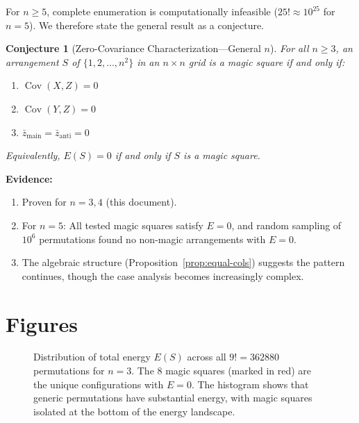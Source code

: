 \documentclass[11pt]{article}
\newtheorem{conjecture}[theorem]{Conjecture}
\theoremstyle{definition}
\theoremstyle{remark}
\begin{document}
For $n \geq 5$, complete enumeration is computationally infeasible ($25! \approx 10^{25}$ for $n=5$). We therefore state the general result as a conjecture.

\begin{conjecture}[Zero-Covariance Characterization---General $n$]\label{conj:general}
For all $n \geq 3$, an arrangement $S$ of $\{1, 2, \ldots, n^2\}$ in an $n \times n$ grid is a magic square if and only if:
\begin{enumerate}[label=(\roman*)]
\item $\operatorname{Cov}(X, Z) = 0$
\item $\operatorname{Cov}(Y, Z) = 0$
\item $\bar{z}_{\text{main}} = \bar{z}_{\text{anti}} = 0$
\end{enumerate}
Equivalently, $E(S) = 0$ if and only if $S$ is a magic square.
\end{conjecture}

\textbf{Evidence:}
\begin{enumerate}
\item Proven for $n = 3, 4$ (this document).
\item For $n = 5$: All tested magic squares satisfy $E = 0$, and random sampling of $10^6$ permutations found no non-magic arrangements with $E = 0$.
\item The algebraic structure (Proposition~\ref{prop:equal-cols}) suggests the pattern continues, though the case analysis becomes increasingly complex.
\end{enumerate}

\section{Figures}

\begin{figure}[h]
\centering
\caption{Distribution of total energy $E(S)$ across all $9! = 362880$ permutations for $n=3$. The 8 magic squares (marked in red) are the unique configurations with $E = 0$. The histogram shows that generic permutations have substantial energy, with magic squares isolated at the bottom of the energy landscape.}
\label{fig:landscape}
\end{figure}
\end{document}
